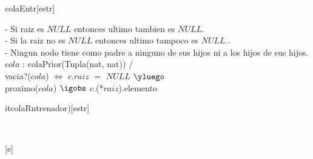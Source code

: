\begin{Representacion}
 
  \begin{Estructura}{colaEntr}[estr]
      \begin{Tupla}[estr]%
    \end{Tupla}
  \end{Estructura}

	\begin{Tupla}[Nodoheap]
	\end{Tupla}

	\begin{Tupla}[entrenador]
	\end{Tupla}


	
- Si raiz es $NULL$ entonces ultimo tambien es $NULL$. \\
- Si la raiz no es $NULL$ entonces ultimo tampoco es $NULL$.. \\
- Ningun nodo tiene como padre a ninguno de sus hijos ni a los hijos de sus hijos. \\ 


%
{
$cola$ : colaPrior(Tupla(nat, nat)) / \\
	vacia?($cola$)  $\iff$  $c$.$raiz$ $=$ $NULL$ $\yluego$ \\
	proximo($cola$) $\igobs$ $c$.(*$raiz$).elemento \\
	
}%

\end{Representacion}

\begin{Representacion}
 
  \begin{Estructura}{itcolaRntrenador)}[estr]
      \begin{Tupla}[estr]%
    \end{Tupla}
  \end{Estructura}


  ~

  [e]{}

\end{Representacion}



